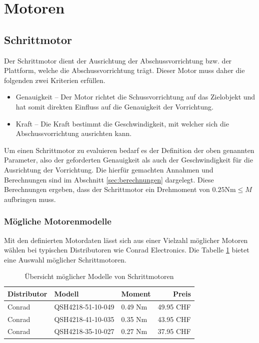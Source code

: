 \section{Motoren} \label{sec:motors}

\subsection{Schrittmotor}
Der Schrittmotor dient der Ausrichtung der Abschussvorrichtung bzw. der
Plattform, welche die Abschussvorrichtung trägt. Dieser Motor muss
daher die folgenden zwei Kriterien erfüllen.

\begin{itemize}
	\item Genauigkeit -- Der Motor richtet die Schussvorrichtung auf
		das Zielobjekt und hat somit direkten Einfluss auf die
		Genauigkeit der Vorrichtung.
	\item Kraft -- Die Kraft bestimmt die Geschwindigkeit, mit welcher
		sich die Abschussvorrichtung ausrichten kann.
\end{itemize}

Um einen Schrittmotor zu evaluieren bedarf es der Definition der oben
genannten Parameter, also der geforderten Genauigkeit als auch der
Geschwindigkeit für die Ausrichtung der Vorrichtung. Die hierfür gemachten
Annahmen und Berechnungen sind im Abschnitt \ref{sec:berechnungen}
dargelegt. Diese Berechnungen ergeben, dass der Schrittmotor ein Drehmoment
von $0.25\text{Nm} \leq M$ aufbringen muss.

\subsubsection{Mögliche Motorenmodelle}
Mit den definierten Motordaten lässt sich aus einer Vielzahl möglicher
Motoren wählen bei typischen Distributoren wie Conrad Electronics. Die
Tabelle \ref{tab:stepper-overview} bietet eine Auswahl möglicher
Schrittmotoren.

\begin{table}[h!]
	\centering
	\begin{tabular}{l l l r}
		Distributor
			& Modell
			& Moment
			& Preis \\ \hline
		Conrad
			& QSH4218-51-10-049
			& 0.49 Nm
			& 49.95 CHF \\
		Conrad
			& QSH4218-41-10-035
			& 0.35 Nm
			& 43.95 CHF \\
		Conrad
			& QSH4218-35-10-027
			& 0.27 Nm
			& 37.95 CHF
	\end{tabular}
	\caption{Übersicht möglicher Modelle von Schrittmotoren}
	\label{tab:stepper-overview}
\end{table}


